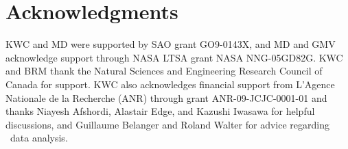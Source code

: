 \documentclass[useAMS,usenatbib]{mn2e}
\begin{document}
\section*{Acknowledgments}

KWC and MD were supported by SAO grant GO9-0143X, and MD and GMV
acknowledge support through NASA LTSA grant NASA NNG-05GD82G. KWC and
BRM thank the Natural Sciences and Engineering Research Council of
Canada for support. KWC also acknowledges financial support from
L'Agence Nationale de la Recherche (ANR) through grant
ANR-09-JCJC-0001-01 and thanks Niayesh Afshordi, Alastair Edge, and
Kazushi Iwasawa for helpful discussions, and Guillaume Belanger and
Roland Walter for advice regarding \integral\ data analysis.






\clearpage
\onecolumn




\clearpage



\label{lastpage}
\end{document}
